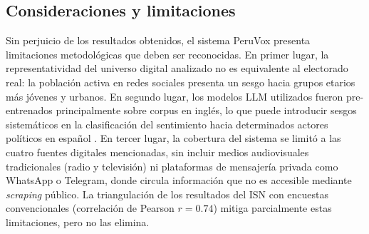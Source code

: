 \documentclass[listof=nochaptergap,12pt,times,authoryear]{report}
\begin{document}
\subsection*{Consideraciones y limitaciones}
Sin perjuicio de los resultados obtenidos, el sistema PeruVox presenta limitaciones
metodológicas que deben ser reconocidas. En primer lugar, la representatividad del
universo digital analizado no es equivalente al electorado real: la población
activa en redes sociales presenta un sesgo hacia grupos etarios más jóvenes y
urbanos. En segundo lugar, los modelos LLM utilizados fueron pre-entrenados
principalmente sobre corpus en inglés, lo que puede introducir sesgos sistemáticos
en la clasificación del sentimiento hacia determinados actores políticos en español
\parencite{pr_gujral2024llm_elections}. En tercer lugar, la cobertura del sistema
se limitó a las cuatro fuentes digitales mencionadas, sin incluir medios
audiovisuales tradicionales (radio y televisión) ni plataformas de mensajería
privada como WhatsApp o Telegram, donde circula información que no es accesible
mediante \textit{scraping} público. La triangulación de los resultados del ISN con encuestas
convencionales (correlación de Pearson $r = 0.74$) mitiga parcialmente estas
limitaciones, pero no las elimina.
\end{document}
